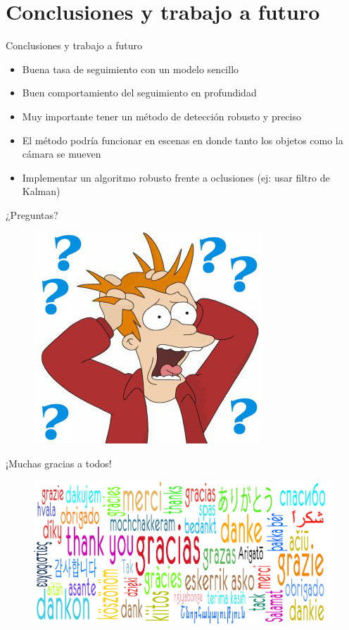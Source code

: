 \documentclass[]{beamer}
\begin{document}
\section{Conclusiones y trabajo a futuro}
\begin{frame}{Conclusiones y trabajo a futuro}
    \begin{itemize}
        \item Buena tasa de seguimiento con un modelo sencillo
        \item Buen comportamiento del seguimiento en profundidad
        \item Muy importante tener un método de detección robusto y preciso
        \item El método podría funcionar en escenas en donde tanto los objetos como la cámara se mueven
        \item Implementar un algoritmo robusto frente a oclusiones (ej: usar filtro de Kalman)
    \end{itemize}
\end{frame}

\begin{frame}[t]{¿Preguntas?}
    \begin{figure}
        \centering
        \includegraphics[scale=0.5]{img/preguntas.jpg}
    \end{figure}
\end{frame}


\begin{frame}[t]{¡Muchas gracias a todos!}
    \vspace{-20pt}
    \begin{figure}
        \centering
        \hspace*{-18pt}\includegraphics[scale=0.2]{img/gracias.jpg}
    \end{figure}
\end{frame}
\end{document}

